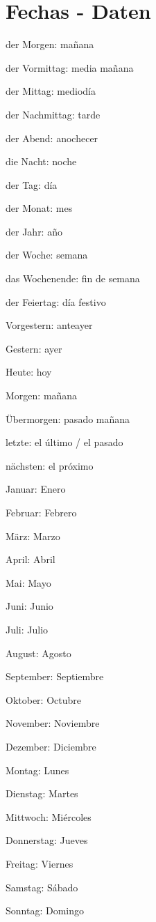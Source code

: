 \section{Fechas - Daten}
\begin{multicols}{2}
\begin{myitemize}
\item der Morgen: mañana
\item der Vormittag: media mañana
\item der Mittag: mediodía
\item der Nachmittag: tarde
\item der Abend: anochecer
\item die Nacht: noche
\item der Tag: día
\item der Monat: mes
\item der Jahr: año
\item der Woche: semana
\item das Wochenende: fin de semana
\item der Feiertag: día festivo
\item Vorgestern: anteayer
\item Gestern: ayer
\item Heute: hoy
\item Morgen: mañana
\item Übermorgen: pasado mañana
\item letzte: el último / el pasado
\item nächsten: el próximo
\item Januar: Enero
\item Februar: Febrero
\item März: Marzo
\item April: Abril
\item Mai: Mayo
\item Juni: Junio
\item Juli: Julio
\item August: Agosto
\item September: Septiembre
\item Oktober: Octubre
\item November: Noviembre
\item Dezember: Diciembre
\item Montag: Lunes
\item Dienstag: Martes
\item Mittwoch: Miércoles
\item Donnerstag: Jueves
\item Freitag: Viernes
\item Samstag: Sábado
\item Sonntag: Domingo
\end{myitemize}
\end{multicols}

